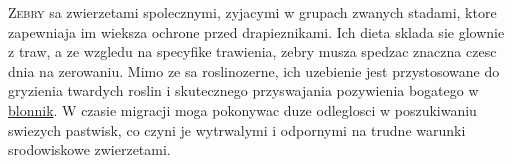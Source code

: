 \textsc{Zebry} sa zwierzetami spolecznymi, zyjacymi w grupach zwanych stadami, ktore zapewniaja im wieksza ochrone przed drapieznikami. Ich dieta sklada sie glownie z traw, a ze wzgledu na specyfike trawienia, zebry musza spedzac znaczna czesc dnia na zerowaniu. Mimo ze sa roslinozerne, ich uzebienie jest przystosowane do gryzienia twardych roslin i skutecznego przyswajania pozywienia bogatego w \underline{blonnik}. W czasie migracji moga pokonywac duze odleglosci w poszukiwaniu swiezych pastwisk, co czyni je wytrwalymi i odpornymi na trudne warunki srodowiskowe zwierzetami.